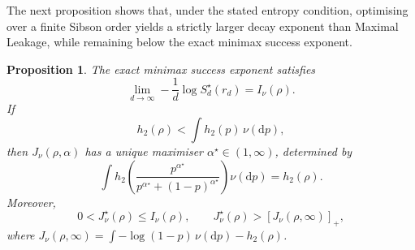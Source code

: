 \documentclass[11pt]{article}
\newtheorem{proposition}[theorem]{Proposition}
\theoremstyle{definition}
\theoremstyle{remark}
\newcommand{\1}{\boldsymbol{1}}
\begin{document}
The next proposition shows that, under the stated entropy condition,
optimising over a finite Sibson order yields a strictly larger decay
exponent than Maximal Leakage, while remaining below the exact minimax
success exponent.


\begin{proposition}
\label{prop:finiteSibsonBeatsLeakage}
The exact minimax success exponent satisfies
\begin{equation}
\lim_{d\to\infty}
-\frac1d\log S_d^\star(r_d)
=
I_\nu(\rho).
\label{eq:heterogeneousExactLD}
\end{equation}
If
\[
h_2(\rho)
<
\int h_2(p)\,\nu(\mathrm dp),
\]
then \(J_\nu(\rho,\alpha)\) has a unique maximiser
\(\alpha^\star\in(1,\infty)\), determined by
\begin{equation}
\int
h_2\left(
\frac{p^{\alpha^\star}}
     {p^{\alpha^\star}+(1-p)^{\alpha^\star}}
\right)
\nu(\mathrm dp)
=
h_2(\rho).
\label{eq:heterogeneousOptimalOrder}
\end{equation}
Moreover,
\begin{equation}
0
<
J_\nu^\star(\rho)
\le
I_\nu(\rho),
\qquad
J_\nu^\star(\rho)
>
[J_\nu(\rho,\infty)]_+,
\label{eq:heterogeneousFiniteOrderBeatsLeakage}
\end{equation}
where
\(J_\nu(\rho,\infty)
=\int-\log(1-p)\,\nu(\mathrm dp)-h_2(\rho)\).
\end{proposition}
\end{document}
